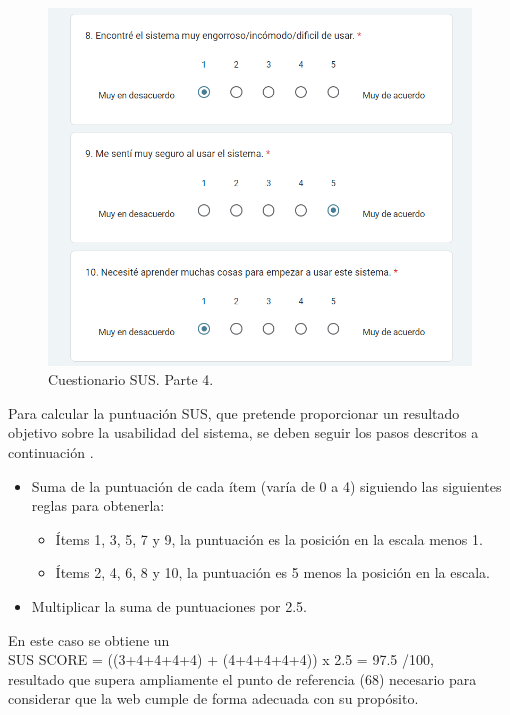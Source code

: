 \begin{figure}[h]
    \centering
    \includegraphics[width=1\textwidth]{img/G1_Resultados/sus4.png}
    \caption{Cuestionario SUS. Parte 4.}
    \label{fig:sus4}
\end{figure}

Para calcular la puntuación SUS, que pretende proporcionar un resultado objetivo sobre la usabilidad del sistema, se deben seguir los pasos descritos a continuación \cite{SUS}.
\begin{itemize}
    \item Suma de la puntuación de cada ítem (varía de 0 a 4) siguiendo las siguientes reglas para obtenerla:
    \begin{itemize}
        \item Ítems 1, 3, 5, 7 y 9, la puntuación es la posición en la escala menos 1.
        \item Ítems 2, 4, 6, 8 y 10, la puntuación es 5 menos la posición en la escala.
    \end{itemize}
    \item Multiplicar la suma de puntuaciones por 2.5.
\end{itemize}

En este caso se obtiene un \\SUS SCORE = ((3+4+4+4+4) + (4+4+4+4+4)) x 2.5 = 97.5 /100, \\resultado que supera ampliamente el punto de referencia (68) necesario para considerar que la web cumple de forma adecuada con su propósito.



